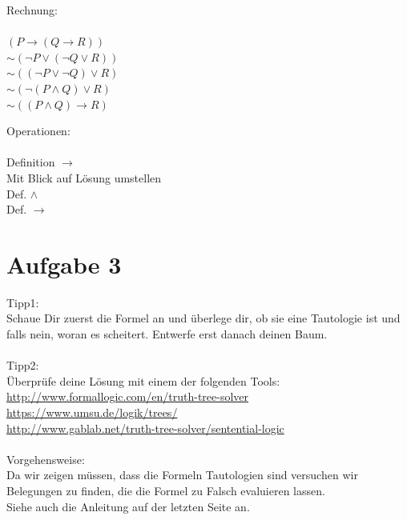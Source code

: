 \documentclass[a4paper]{scrartcl}
\begin{document}
        \begin{minipage}[t]{0.55\textwidth}
            Rechnung:\\
            \\
            $(P \rightarrow (Q \rightarrow R))$\\
            $\sim (\neg P \lor (\neg Q \lor R))$\\
            $\sim ((\neg P \lor \neg Q) \lor R)$\\
            $\sim (\neg (P \land Q) \lor R)$\\
            $\sim ((P \land Q) \rightarrow R)$\\
        \end{minipage}
        \begin{minipage}[t]{0.4\textwidth}
            Operationen:\\
            \\
            Definition $\rightarrow$\\
            Mit Blick auf Lösung umstellen\\
            Def. $\land$\\
            Def. $\rightarrow$
        \end{minipage}

\newpage

\section*{Aufgabe 3}%
\label{sec:aufgabe_3}

Tipp1:\\
Schaue Dir zuerst die Formel an und überlege dir, ob sie eine Tautologie ist und falls nein, woran es scheitert.
Entwerfe erst danach deinen Baum.\\
\\
Tipp2:\\
Überprüfe deine Lösung mit einem der folgenden Tools:\\
\url{http://www.formallogic.com/en/truth-tree-solver}\\
\url{https://www.umsu.de/logik/trees/}\\
\url{http://www.gablab.net/truth-tree-solver/sentential-logic}\\
\\
Vorgehensweise:\\
Da wir zeigen müssen, dass die Formeln Tautologien sind versuchen wir Belegungen zu finden, die die Formel zu Falsch evaluieren lassen.\\
Siehe auch die Anleitung auf der letzten Seite an.
\end{document}
